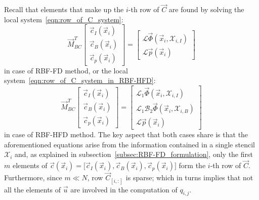 Recall that elements that make up the $i$-th row of $\vec{C}$ are found by solving the local system~\eqref{eqn:row_of_C_system}:
\begin{equation}
	\label{eqn:local_RBF-FD_system_adjoint_1D}
	\vec{M}_{BC}^T
	\begin{bmatrix}
		\vec{c}_I(\vec{x}_i)  \\
		\vec{c}_B(\vec{x}_i)  \\
		\vec{c}_p(\vec{x}_i)
	\end{bmatrix} = 
	\begin{bmatrix}
		\mathcal{L} \vec{\Phi}(\vec{x}_i, \mathcal{X}_{i,I})  \\
		\mathcal{L} \vec{p}(\vec{x}_i)
	\end{bmatrix}
\end{equation}
in case of RBF-FD method, or the local system~\eqref{eqn:row_of_C_system_in_RBF-HFD}:
\begin{equation}
	\label{eqn:adjoint_method_row_of_C_system_in_RBF-HFD}
	\vec{M}_{BC}^T
	\begin{bmatrix}
		\vec{c}_I(\vec{x}_i)  \\
		\vec{c}_B(\vec{x}_i)  \\
		\vec{c}_p(\vec{x}_i)
	\end{bmatrix} = 
	\begin{bmatrix}
		\mathcal{L}_1 \vec{\Phi}(\vec{x}_i, \mathcal{X}_{i,I})  			  \\
		\mathcal{L}_1 \mathcal{B}_2 \vec{\Phi}(\vec{x}_i, \mathcal{X}_{i,B})  \\
		\mathcal{L} \vec{p}(\vec{x}_i)
	\end{bmatrix}
\end{equation}
in case of RBF-HFD method. The key aspect that both cases share is that the aforementioned equations arise from the information contained in a single stencil $\mathcal{X}_i$ and, as explained in subsection~\vref{subsec:RBF-FD_formulation}, only the first $m$ elements of $\vec{c}(\vec{x}_i) = \bigl[ \vec{c}_I(\vec{x}_i), \vec{c}_B(\vec{x}_i), \vec{c}_p(\vec{x}_i) \bigr]$ form the $i$-th row of $\vec{C}$. 
Furthermore, since $m \ll N$, row $\vec{C}_{[i,:]}$ is sparse; which in turns implies that not all the elements of $\vec{u}$ are involved in the computation of $q_{i,j}$.

